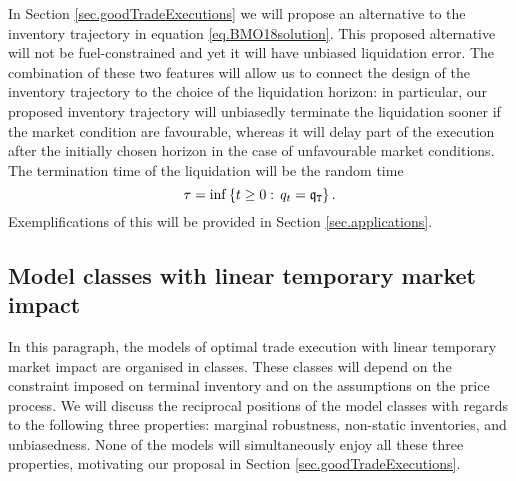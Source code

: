 \documentclass[10pt,a4paper]{article}
\begin{document}
In Section \ref{sec.goodTradeExecutions} we will propose an alternative to the inventory trajectory in equation \eqref{eq.BMO18solution}. This proposed alternative will not be fuel-constrained and yet it will have unbiased liquidation error. The combination of these two features will allow us to connect the design of the inventory trajectory to the choice of the liquidation horizon: in particular, our proposed inventory trajectory will unbiasedly terminate the liquidation sooner if the market condition are favourable, whereas it will delay part of the execution after the initially chosen horizon in the case of unfavourable market conditions. The termination time of the liquidation will be the random time
\begin{equation}
\tau = \inf\left \lbrace t\geq 0 : \, q_t = \mathfrak{q}_{\mathtt{T} } \right \rbrace.
\end{equation}
Exemplifications of this will be provided in Section \ref{sec.applications}. 

\subsection{Model classes with linear temporary market impact}\label{sec.modelClasses}
In this  paragraph, the models of optimal trade execution with linear temporary market impact are organised in classes. These classes will depend on the constraint imposed on terminal inventory and on the assumptions on the price process. We will discuss the reciprocal positions of the model classes with regards to the following three properties:  marginal robustness, non-static inventories, and unbiasedness. None of the models will simultaneously enjoy all these three properties, motivating our  proposal in Section \ref{sec.goodTradeExecutions}.
\end{document}
